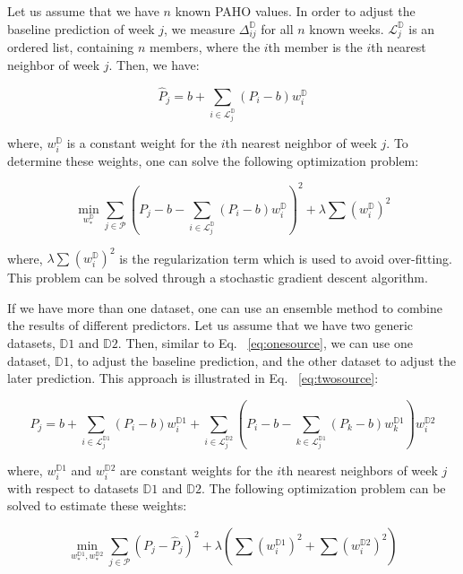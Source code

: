 Let us assume that we have $n$ known PAHO values. In order to adjust the baseline prediction of week $j$, we measure $\Delta_{ij}^\mathbb{D}$ for all $n$ known weeks. $\mathcal{L}_{j}^\mathbb{D}$ is an ordered list, containing $n$ members, where the $i$th member is the $i$th nearest neighbor of week $j$. Then, we have:

\begin{equation}
\hat{P}_{j} = b + \sum_{i \in \mathcal{L}_{j}^\mathbb{D}}{} (P_i - b)w_{i}^\mathbb{D}
\label{eq:onesource}
\end{equation}

where, $w_{i}^\mathbb{D}$ is a constant weight for the $i$th nearest neighbor of week $j$. To determine these weights, one can solve the following optimization problem:

\begin{equation}
\min_{w_{*}^\mathbb{D}} \sum_{j \in \mathcal{P}} {(P_j - b - \sum_{i \in \mathcal{L}_{j}^\mathbb{D}}{} (P_i - b)w_{i}^\mathbb{D})^2} + \lambda \sum_{}{}{{(w_{i}^\mathbb{D})}^2}
\end{equation}

where, $\lambda \sum_{}{}{{(w_{i}^\mathbb{D})}^2}$ is the regularization term which is used to avoid over-fitting. This problem can be solved through a stochastic gradient descent algorithm.

If we have more than one dataset, one can use an ensemble method to combine the results of different predictors. Let us assume that we have two generic datasets, $\mathbb{D}1$ and $\mathbb{D}2$. Then, similar to Eq. ~\ref{eq:onesource}, we can use one dataset, $\mathbb{D}1$, to adjust the baseline prediction, and the other dataset to adjust the later prediction. This approach is illustrated in Eq. ~\ref{eq:twosource}:

\begin{equation}
\hat{P}_{j} = b + \sum_{i \in \mathcal{L}_{j}^{\mathbb{D}1}}{} (P_i - b)w_{i}^{\mathbb{D}1} + \sum_{i \in \mathcal{L}_{j}^{\mathbb{D}2}}{} (P_i - b - \sum_{k \in \mathcal{L}_{j}^{\mathbb{D}1}}{} (P_k - b)w_{k}^{\mathbb{D}1})w_{i}^{\mathbb{D}2}
\label{eq:twosource}
\end{equation}

where, $w_{i}^{\mathbb{D}1}$ and $w_{i}^{\mathbb{D}2}$ are constant weights for the $i$th nearest neighbors of week $j$ with respect to datasets $\mathbb{D}1$ and $\mathbb{D}2$. The following optimization problem can be solved to estimate these weights:

\begin{equation}
\min_{w_{*}^{\mathbb{D}1},w_{*}^{\mathbb{D}2}} \sum_{j \in \mathcal{P}} {(P_j - \hat{P}_j)^2} + \lambda (\sum_{}{}{{(w_{i}^{\mathbb{D}1})}^2}+\sum_{}{}{{(w_{i}^{\mathbb{D}2})}^2})
\label{eq:opt2}
\end{equation}


